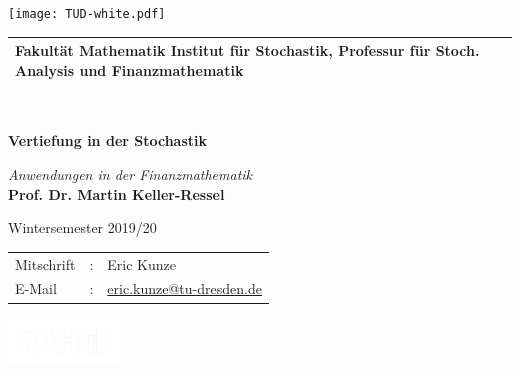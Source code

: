 \documentclass[ngerman, a4paper, 11pt]{report}
\theoremstyle{plain}
\theoremstyle{plain}
\theoremstyle{plain}
\theoremstyle{nonumberplain}
\theoremstyle{proofstyle}
\begin{document}
	
	\begin{titlepage}
		\pagecolor{cddarkblue!90}
		\color{white}
		
		\raggedright
		\fosfamily
		\setlength{\parindent}{0pt}
		
		\hspace{-18.6mm} %
		\texttt{[image: TUD-white.pdf]} \\
		
		\vspace{3mm}
		\begin{tabular}{m{\textwidth}}
			\hline
			\hspace{-4pt}\small{\textbf{Fakultät Mathematik} Institut für Stochastik, Professur für Stoch. Analysis und Finanzmathematik} \\
			\hline
		\end{tabular} \\
		
		\vspace{5cm}
		{\Huge\bfseries \MakeUppercase Vertiefung in der Stochastik \par}
		\vspace{0.5cm}%
		{\Large \itshape Anwendungen in der Finanzmathematik} \\
		\vspace{1.5cm}
		\textbf{{\Large Prof. Dr. Martin Keller-Ressel}} \par
		\vspace{0.5cm}
		{\large Wintersemester 2019/20}
		
		\vfill
		\begin{minipage}{\dimexpr0.75\linewidth-\fboxrule-\fboxsep}
			\begin{tabular}{lll}
				Mitschrift  & : & Eric Kunze \\
				E-Mail      & : & \href{mailto:eric.kunze@tu-dresden.de}{eric.kunze@tu-dresden.de} \\
			\end{tabular}
		\end{minipage}
		\begin{minipage}{\dimexpr0.25\linewidth-\fboxrule-\fboxsep}
			\flushright
			\href{%
				https://github.com/oakoneric/skript-finanzmathe1
			}{%
				\includegraphics[width=8em]{img/GitHub-Logo-White.png}%
			}
		\end{minipage}
	\end{titlepage}
	\nopagecolor
\end{document}

